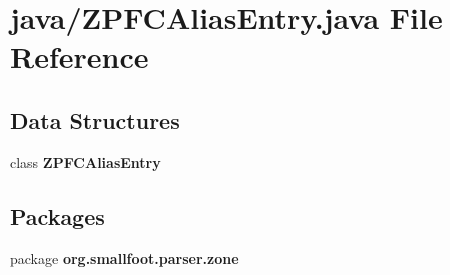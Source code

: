 \section{java/\+Z\+P\+F\+C\+Alias\+Entry.java File Reference}
\label{ZPFCAliasEntry_8java}
\subsection*{Data Structures}
\begin{DoxyCompactItemize}
\item 
class {\bf Z\+P\+F\+C\+Alias\+Entry}
\end{DoxyCompactItemize}
\subsection*{Packages}
\begin{DoxyCompactItemize}
\item 
package {\bf org.\+smallfoot.\+parser.\+zone}
\end{DoxyCompactItemize}
